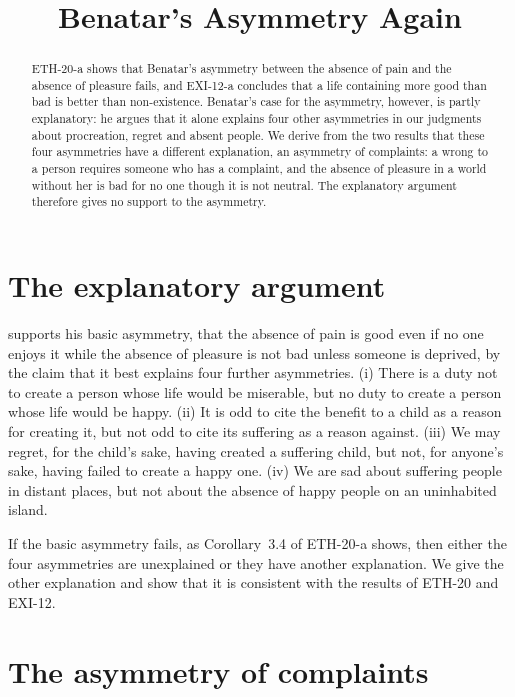 \documentclass{situationist-preprint}
\title{Benatar's Asymmetry Again}
\begin{document}
\maketitle

\begin{abstract}
ETH-20-a shows that Benatar's asymmetry between the absence of pain and the absence of pleasure fails, and EXI-12-a concludes that a life containing more good than bad is better than non-existence. Benatar's case for the asymmetry, however, is partly explanatory: he argues that it alone explains four other asymmetries in our judgments about procreation, regret and absent people. We derive from the two results that these four asymmetries have a different explanation, an asymmetry of complaints: a wrong to a person requires someone who has a complaint, and the absence of pleasure in a world without her is bad for no one though it is not neutral. The explanatory argument therefore gives no support to the asymmetry.
\end{abstract}

\section{The explanatory argument}

\citet[ch.~2]{Benatar2006} supports his basic asymmetry, that the absence of pain is good even if no one enjoys it while the absence of pleasure is not bad unless someone is deprived, by the claim that it best explains four further asymmetries. (i) There is a duty not to create a person whose life would be miserable, but no duty to create a person whose life would be happy. (ii) It is odd to cite the benefit to a child as a reason for creating it, but not odd to cite its suffering as a reason against. (iii) We may regret, for the child's sake, having created a suffering child, but not, for anyone's sake, having failed to create a happy one. (iv) We are sad about suffering people in distant places, but not about the absence of happy people on an uninhabited island.

If the basic asymmetry fails, as Corollary~3.4 of ETH-20-a shows, then either the four asymmetries are unexplained or they have another explanation. We give the other explanation and show that it is consistent with the results of ETH-20 and EXI-12.

\section{The asymmetry of complaints}
\end{document}
